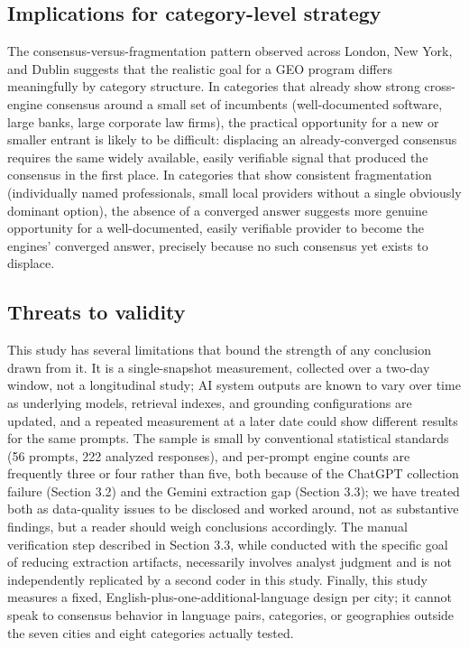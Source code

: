\documentclass[11pt]{article}
\begin{document}
\subsection{Implications for category-level strategy}

The consensus-versus-fragmentation pattern observed across London, New York, and Dublin
suggests that the realistic goal for a GEO program differs meaningfully by category
structure. In categories that already show strong cross-engine consensus around a small
set of incumbents (well-documented software, large banks, large corporate law firms),
the practical opportunity for a new or smaller entrant is likely to be difficult:
displacing an already-converged consensus requires the same widely available, easily
verifiable signal that produced the consensus in the first place. In categories that
show consistent fragmentation (individually named professionals, small local providers
without a single obviously dominant option), the absence of a converged answer suggests
more genuine opportunity for a well-documented, easily verifiable provider to become the
engines' converged answer, precisely because no such consensus yet exists to displace.

\subsection{Threats to validity}

This study has several limitations that bound the strength of any conclusion drawn from
it. It is a single-snapshot measurement, collected over a two-day window, not a
longitudinal study; AI system outputs are known to vary over time as underlying models,
retrieval indexes, and grounding configurations are updated, and a repeated measurement
at a later date could show different results for the same prompts. The sample is
small by conventional statistical standards (56 prompts, 222 analyzed responses), and
per-prompt engine counts are frequently three or four rather than five, both because of
the ChatGPT collection failure (Section 3.2) and the Gemini extraction gap
(Section 3.3); we have treated both as data-quality issues to be disclosed and worked
around, not as substantive findings, but a reader should weigh conclusions accordingly.
The manual verification step described in Section 3.3, while conducted with the
specific goal of reducing extraction artifacts, necessarily involves analyst judgment
and is not independently replicated by a second coder in this study. Finally, this
study measures a fixed, English-plus-one-additional-language design per city; it cannot
speak to consensus behavior in language pairs, categories, or geographies outside the
seven cities and eight categories actually tested.
\end{document}
